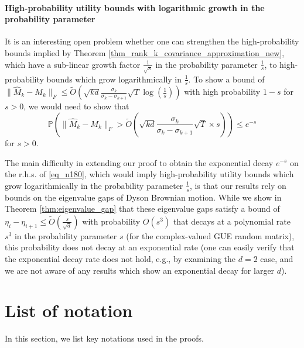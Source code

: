 \documentclass[11pt,letterpaper]{article}
\begin{document}
\paragraph{High-probability utility bounds with logarithmic growth in the probability parameter}

   It is an interesting open problem whether one can strengthen the high-probability bounds implied by Theorem \ref{thm_rank_k_covariance_approximation_new}, which have a sub-linear growth factor $\frac{1}{\sqrt{s}}$ in the probability parameter $\frac{1}{s}$, to high-probability bounds which grow logarithmically in $\frac{1}{s}$.
%
 To show a bound of $\|\hat{M}_k - M_k \|_F \leq \tilde{O}(\sqrt{kd} \frac{\sigma_k}{\sigma_k - \sigma_{k+1}}  \sqrt{T}  \log(\frac{1}{s}))$ with high probability $1-s$ for $s>0$, we would need to show that
 \begin{equation}\label{eq_n180}
 \mathbb{P}\left(\|\hat{M}_k - M_k \|_F > \tilde{O}\left (\sqrt{kd} \frac{\sigma_k}{\sigma_k - \sigma_{k+1}}  \sqrt{T}  \times s \right) \right) \leq e^{-s}
 \end{equation}
 for $s>0$. 
 
 The main difficulty in extending our proof to obtain the exponential decay $e^{-s}$ on the r.h.s. of \eqref{eq_n180}, which would imply high-probability utility bounds which grow logarithmically in the probability parameter $\frac{1}{s}$,  is that our results rely on bounds on the eigenvalue gaps of Dyson Brownian motion. 
 While we show in Theorem \ref{thm:eigenvalue_gap} that these eigenvalue gaps satisfy a bound of \(\eta_i - \eta_{i+1} \leq \tilde{O}\left(\frac{s}{\sqrt{d}}\right)\) with probability \(O(s^3)\) that decays at a polynomial rate \(s^3\) in the probability parameter \(s\) (for the complex-valued GUE random matrix), this probability does not decay at an exponential rate (one can easily verify that the exponential decay rate does not hold, e.g., by examining the \(d=2\) case, and we are not aware of any results which show an exponential decay for larger \(d\)).

%
    \section{List of notation}\label{sec_glossary_of_notation}
     In this section, we list key notations used in the proofs.
     
\end{document}
